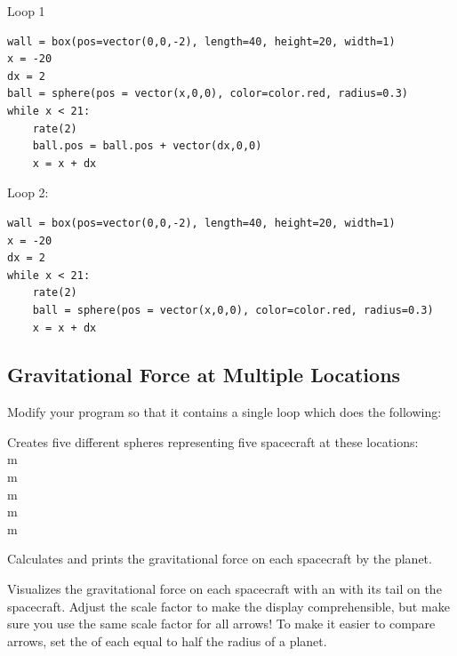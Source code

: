 \documentclass[10pt]{article}
\begin{document}
 
Loop 1

\color{CodeColor}
\begin{Verbatim}[frame=single]  
wall = box(pos=vector(0,0,-2), length=40, height=20, width=1)
x = -20
dx = 2
ball = sphere(pos = vector(x,0,0), color=color.red, radius=0.3)
while x < 21:
    rate(2)
    ball.pos = ball.pos + vector(dx,0,0)
    x = x + dx
\end{Verbatim}
\color{black}

Loop 2:

\color{CodeColor}
\begin{Verbatim}[frame=single]
wall = box(pos=vector(0,0,-2), length=40, height=20, width=1)
x = -20
dx = 2
while x < 21:
    rate(2)
    ball = sphere(pos = vector(x,0,0), color=color.red, radius=0.3)
    x = x + dx
\end{Verbatim}
\color{black}


\subsection{Gravitational Force at Multiple Locations}

Modify your program so that it contains a single \while loop which does the following:\\

\begin{compactitem}[\color{MIRed}$\Rightarrow$]
\item Creates five different spheres representing five spacecraft at these locations:\\
 m\\
 m\\
 m\\
 m\\
 m\\
\item Calculates and prints the gravitational force on each spacecraft by the planet.
\item Visualizes the gravitational force on each spacecraft with an  with its tail on the spacecraft. 
Adjust the scale factor to make the display comprehensible, but make sure you use the same scale factor for all arrows! 
To make it easier to compare arrows, set the  of each  equal to half the radius of a planet.\\
\end{compactitem}
\end{document}
